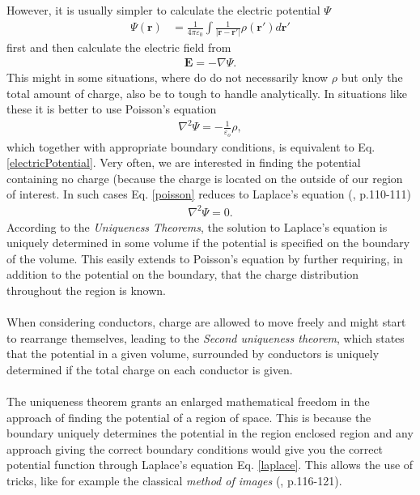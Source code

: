 %
However, it is usually simpler to calculate the electric potential $\Psi$
\begin{align}
   \label{electricPotential}
   \Psi(\boldsymbol{r}) 
   &= \frac{1}{4 \pi \varepsilon_0} \int \frac{1}{\big|\boldsymbol{r} - \boldsymbol{r'}\big|} 
                                                           \rho(\boldsymbol{r'}) d\!\boldsymbol{r'}
\end{align}
first and then calculate the electric field from
\begin{align}
   \boldsymbol{E} = - \nabla \Psi.
\end{align}
This might in some situations, where do do not necessarily know $\rho$ but only the total amount of 
charge, also be to tough to handle analytically. In situations like these it is better to use
Poisson's equation
\begin{align}
   \label{poisson}
   \nabla^2 \Psi= - \frac{1}{\varepsilon_o} \rho,
\end{align}
which together with appropriate boundary conditions, is equivalent to Eq.\eqref{electricPotential}.
Very often, we are interested in finding the potential containing no charge (because the charge is 
located on the outside of our region of interest. In such cases Eq. \eqref{poisson} reduces to
Laplace's equation (\cite{Griffiths}, p.110-111)
\begin{align}
   \label{laplace}
   \nabla^2 \Psi = 0.
\end{align}
According to the \textit{Uniqueness Theorems}, the solution to Laplace's equation is uniquely 
determined in some volume if the potential is specified on the boundary of the volume. This
easily extends to Poisson's equation by further requiring, in addition to the 
potential on the boundary, that the charge distribution throughout the region is known.
\\
\\
When considering conductors, charge are allowed to move freely and  might start to rearrange themselves,
leading to the \textit{Second uniqueness theorem}, which states that the potential in a given volume,
surrounded by conductors is uniquely determined if the total charge on each conductor is given.
\\
\\
The uniqueness theorem grants an enlarged mathematical freedom in the approach of finding the potential
of a region of space. This is because the boundary uniquely determines the potential in the region enclosed
region and any approach giving the correct boundary conditions would give you the correct potential 
function through Laplace's equation Eq. \eqref{laplace}. This allows the use of tricks, like for example
the classical \textit{method of images} (\cite{Griffiths}, p.116-121).





